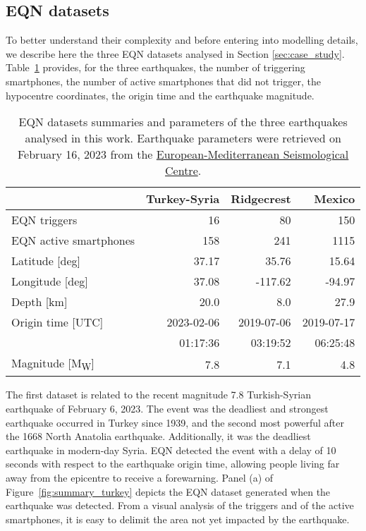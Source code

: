 \documentclass[final]{statsoc}
\begin{document}
\subsection{EQN datasets}\label{sec:EQN_datasets}

To better understand their complexity and before entering into modelling details, we describe here the three EQN datasets analysed in Section \ref{sec:case_study}.
Table~\ref{tab:cs_details} provides, for the three earthquakes, the number of triggering smartphones, the number of active smartphones that did not trigger, the hypocentre coordinates, the origin time and the earthquake magnitude.

\begin{table}
    \caption{\label{tab:cs_details} EQN datasets summaries and parameters of the three earthquakes analysed in this work. Earthquake parameters were retrieved on February 16, 2023 from the \href{https://www.emsc-csem.org}{European-Mediterranean Seismological Centre}.}
    \centering
        \begin{tabular}{l|rrr}
        & Turkey-Syria & Ridgecrest & Mexico \\ \hline
        EQN triggers & 16 & 80 & 150 \\ 
        EQN active smartphones & 158 & 241 & 1115 \\ 
        Latitude [deg] & 37.17 & 35.76 & 15.64 \\ 
        Longitude [deg] & 37.08 & -117.62 & -94.97 \\ 
        Depth [km] & 20.0 & 8.0 & 27.9 \\ 
        Origin time [UTC] & 2023-02-06  & 2019-07-06  & 2019-07-17  \\ 
        & 01:17:36 & 03:19:52 & 06:25:48 \\ 
        Magnitude [M\textsubscript{W}] & 7.8 & 7.1 & 4.8
        \end{tabular}
\end{table}

The first dataset is related to the recent magnitude 7.8 Turkish-Syrian earthquake of February 6, 2023. The event was the deadliest and strongest earthquake occurred in Turkey since 1939, and the second most powerful after the 1668 North Anatolia earthquake. Additionally, it was the deadliest earthquake in modern-day Syria. EQN detected the event with a delay of 10 seconds with respect to the earthquake origin time, allowing people living far away from the epicentre to receive a forewarning. Panel (a) of Figure~\ref{fig:summary_turkey} depicts the EQN dataset generated when the earthquake was detected. From a visual analysis of the triggers and of the active smartphones, it is easy to delimit the area not yet impacted by the earthquake.
\end{document}

